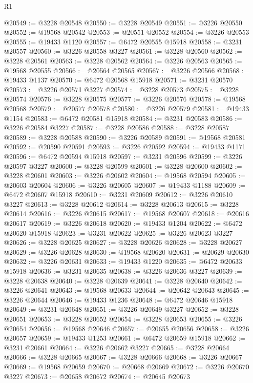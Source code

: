 \begin{lexlean}{R1}
\begin{coremodule}
@20549 := @3228 @20548
@20550 := @3228 @20549
@20551 := @3226 @20550
@20552 := @19568 @20542
@20553 := @20551 @20552
@20554 := @3226 @20553
@20555 := @19433 @1120
@20557 := @6472 @20555 @15918
@20558 := @3231 @20557
@20560 := @3226 @20558 @3227
@20561 := @3228 @20560
@20562 := @3228 @20561
@20563 := @3228 @20562
@20564 := @3226 @20563
@20565 := @19568 @20555
@20566 := @20564 @20565
@20567 := @3226 @20566
@20568 := @19433 @1137
@20570 := @6472 @20568 @15918
@20571 := @3231 @20570
@20573 := @3226 @20571 @3227
@20574 := @3228 @20573
@20575 := @3228 @20574
@20576 := @3228 @20575
@20577 := @3226 @20576
@20578 := @19568 @20568
@20579 := @20577 @20578
@20580 := @3226 @20579
@20581 := @19433 @1154
@20583 := @6472 @20581 @15918
@20584 := @3231 @20583
@20586 := @3226 @20584 @3227
@20587 := @3228 @20586
@20588 := @3228 @20587
@20589 := @3228 @20588
@20590 := @3226 @20589
@20591 := @19568 @20581
@20592 := @20590 @20591
@20593 := @3226 @20592
@20594 := @19433 @1171
@20596 := @6472 @20594 @15918
@20597 := @3231 @20596
@20599 := @3226 @20597 @3227
@20600 := @3228 @20599
@20601 := @3228 @20600
@20602 := @3228 @20601
@20603 := @3226 @20602
@20604 := @19568 @20594
@20605 := @20603 @20604
@20606 := @3226 @20605
@20607 := @19433 @1188
@20609 := @6472 @20607 @15918
@20610 := @3231 @20609
@20612 := @3226 @20610 @3227
@20613 := @3228 @20612
@20614 := @3228 @20613
@20615 := @3228 @20614
@20616 := @3226 @20615
@20617 := @19568 @20607
@20618 := @20616 @20617
@20619 := @3226 @20618
@20620 := @19433 @1204
@20622 := @6472 @20620 @15918
@20623 := @3231 @20622
@20625 := @3226 @20623 @3227
@20626 := @3228 @20625
@20627 := @3228 @20626
@20628 := @3228 @20627
@20629 := @3226 @20628
@20630 := @19568 @20620
@20631 := @20629 @20630
@20632 := @3226 @20631
@20633 := @19433 @1220
@20635 := @6472 @20633 @15918
@20636 := @3231 @20635
@20638 := @3226 @20636 @3227
@20639 := @3228 @20638
@20640 := @3228 @20639
@20641 := @3228 @20640
@20642 := @3226 @20641
@20643 := @19568 @20633
@20644 := @20642 @20643
@20645 := @3226 @20644
@20646 := @19433 @1236
@20648 := @6472 @20646 @15918
@20649 := @3231 @20648
@20651 := @3226 @20649 @3227
@20652 := @3228 @20651
@20653 := @3228 @20652
@20654 := @3228 @20653
@20655 := @3226 @20654
@20656 := @19568 @20646
@20657 := @20655 @20656
@20658 := @3226 @20657
@20659 := @19433 @1253
@20661 := @6472 @20659 @15918
@20662 := @3231 @20661
@20664 := @3226 @20662 @3227
@20665 := @3228 @20664
@20666 := @3228 @20665
@20667 := @3228 @20666
@20668 := @3226 @20667
@20669 := @19568 @20659
@20670 := @20668 @20669
@20672 := @3226 @20670 @3227
@20673 := @20658 @20672
@20674 := @20645 @20673

\end{coremodule}
\end{lexlean}
